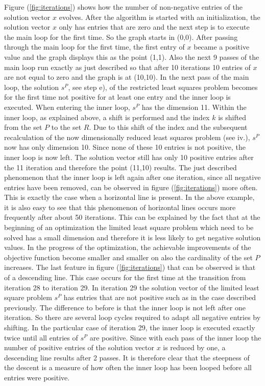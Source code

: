 Figure (\ref{fig:iterations}) shows how the number of non-negative entries of the solution vector $x$ evolves. After the algorithm is started with an initialization, the solution vector $x$ only has entries that are zero and the next step is to execute the main loop for the first time. So the graph starts in (0,0). After passing through the main loop for the first time, the first entry of $x$ became a positive value and the graph displays this as the point (1,1). Also the next 9 passes of the main loop run exactly as just described so that after 10 iterations 10 entries of $x$ are not equal to zero and the graph is at (10,10). In the next pass of the main loop, the solution $s^P$, see step e), of the restricted least squares problem becomes for the first time not positive for at least one entry and the inner loop is executed. When entering the inner loop, $s^P$ has the dimension 11. Within the inner loop, as explained above, a shift is performed and the index $k$ is shifted from the set $P$ to the set $R$. Due to this shift of the index and the subsequent recalculation of the now dimensionally reduced least squares problem (see iv.), $s^P$ now has only dimension 10. Since none of these 10 entries is not positive, the inner loop is now left. The solution vector still has only 10 positive entries after the 11 iteration and therefore the point (11,10) results. The just described phenomenon that the inner loop is left again after one iteration, since all negative entries have been removed, can be observed in figure (\ref{fig:iterations}) more often. This is exactly the case when a horizontal line is present. In the above example, it is also easy to see that this phenomenon of horizontal lines occurs more frequently after about 50 iterations. This can be explained by the fact that at the beginning of an optimization the limited least square problem which need to be solved has a small dimension and therefore it is less likely to get negative solution values. In the progress of the optimization, the achievable improvements of the objective function become smaller and smaller on also the cardinality of the set $P$ increases. The last feature in figure (\ref{fig:iterations}) that can be observed is that of a descending line. This case occurs for the first time at the transition from iteration 28 to iteration 29. In iteration 29 the solution vector of the limited least square problem $s^P$ has entries that are not positive such as in the case described previously. The difference to before is that the inner loop is not left after one iteration. So there are several loop cycles required to adapt all negative entries by shifting. In the particular case of iteration 29, the inner loop is executed exactly twice until all entries of $s^P$ are positive. Since with each pass of the inner loop the number of positive entries of the solution vector $x$ is reduced by one, a descending line results after 2 passes. It is therefore clear that the steepness of the descent is a measure of how often the inner loop has been looped before all entries were positive. 


